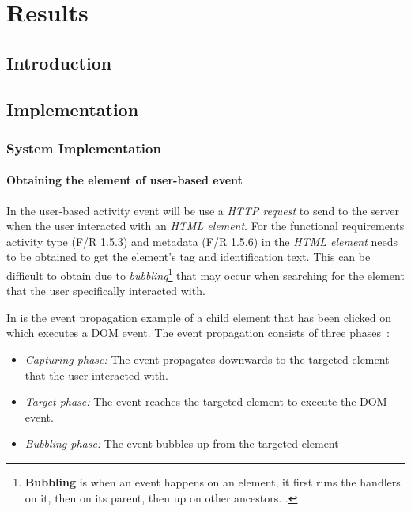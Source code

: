 \chapter{Results}
\label{chap:3}

\section{Introduction}

\section{Implementation}

\subsection{System Implementation}

\subsubsection{Obtaining the element of user-based event}\label{sec:ch2_ElementObtaining}
In  the user-based activity event will be use a \textit{HTTP request} to send to the server when the user interacted with an \textit{HTML element}. For the functional requirements activity type (F/R 1.5.3) and metadata (F/R 1.5.6) in  the \textit{HTML element} needs to be obtained to get the element's tag and identification text. This can be difficult to obtain due to \textit{bubbling}\footnote{\textbf{Bubbling} is when an event happens on an element, it first runs the handlers on it, then on its parent, then up on other ancestors. \cite{EventBubbling}.} that may occur when searching for the element that the user specifically interacted with.\par In  is the event propagation example of a child element that has been clicked on which executes a DOM event. The event propagation consists of three phases~\cite{EventBubbling}:

\begin{itemize}
	\item \textit{Capturing phase:} The event propagates downwards to the targeted element that the user interacted with.
	\item \textit{Target phase:} The event reaches the targeted element to execute the DOM event.
	\item \textit{Bubbling phase:} The event bubbles up from the targeted element
\end{itemize}

